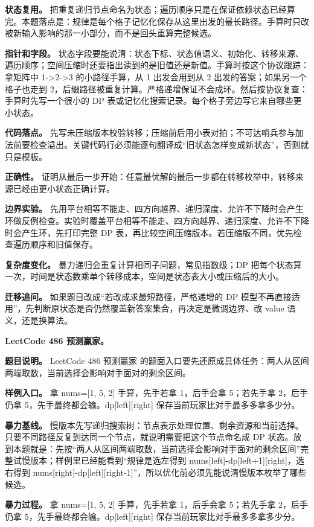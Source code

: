 \textbf{状态复用。} 把重复递归节点命名为状态；遍历顺序只是在保证依赖状态已经算完。本题落点是：规律是每个格子记忆化保存从这里出发的最长路径。手算时只改被新输入影响的那一小部分，而不是回头重算完整候选。

\textbf{指针和字段。} 状态字段要能说清：状态下标、状态值语义、初始化、转移来源、遍历顺序；空间压缩时还要指出读到的是旧值还是新值。手算时按这个协议跟踪：拿矩阵中 1->2->3 的小路径手算，从 1 出发会用到从 2 出发的答案；如果另一个格子也走到 2，后缀路径被重复计算。严格递增保证不会成环。然后按协议复查：手算时先写一个很小的 DP 表或记忆化搜索记录。每个格子旁边写它来自哪些更小状态。

\textbf{代码落点。} 先写未压缩版本校验转移；压缩前后用小表对拍；不可达哨兵参与加法前要检查溢出。关键代码行必须能逐句翻译成“旧状态怎样变成新状态”，否则就只是模板。

\textbf{正确性。} 证明从最后一步开始：任意最优解的最后一步都在转移枚举中，转移来源已经由更小状态正确计算。

\textbf{边界实验。} 先用平台相等不能走、四方向越界、递归深度、允许不下降时会产生环做反例检查。实验时覆盖平台相等不能走、四方向越界、递归深度、允许不下降时会产生环，先打印完整 DP 表，再比较空间压缩版本。若压缩版不同，优先检查遍历顺序和旧值保存。

\textbf{复杂度变化。} 暴力递归会重复计算相同子问题，常见指数级；DP 把每个状态算一次，时间是状态数乘单个转移成本，空间是状态表大小或压缩后的大小。

\textbf{迁移追问。} 如果题目改成“若改成求最短路径，严格递增的 DP 模型不再直接适用”，先判断原状态是否仍然覆盖新答案集合，再决定是微调边界、改 value 语义，还是换算法。

\noindent\textbf{LeetCode 486 预测赢家。}

\textbf{题目说明。} LeetCode 486 预测赢家 的题面入口要先还原成具体任务：两人从区间两端取数，当前选择会影响对手面对的剩余区间。

\textbf{样例入口。} 拿 nums=[1, 5, 2] 手算，先手若拿 1，后手会拿 5；若先手拿 2，后手仍拿 5，先手最终都会输。dp[left][right] 保存当前玩家比对手最多多拿多少分。

\textbf{暴力基线。} 慢版本先写递归搜索树：节点表示处理位置、剩余资源和当前选择。只要不同路径反复到达同一个节点，就说明需要把这个节点命名成 DP 状态。放到本题就是：先按“两人从区间两端取数，当前选择会影响对手面对的剩余区间”完整试慢版本；样例里已经能看到“规律是选左得到 nums[left]-dp[left+1][right]，选右得到 nums[right]-dp[left][right-1]”，所以优化前必须先能说清慢版本枚举了哪些候选。

\textbf{暴力过程。} 拿 nums=[1, 5, 2] 手算，先手若拿 1，后手会拿 5；若先手拿 2，后手仍拿 5，先手最终都会输。dp[left][right] 保存当前玩家比对手最多多拿多少分。


